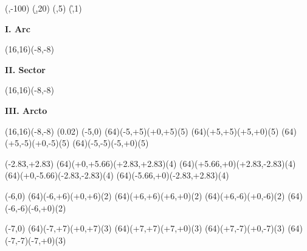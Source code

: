 

\Defnum(\a,-100)
\Defnum(\b,20)
\Defnum(\n,5)
\Defdim(\r,1)



\begin{center}
{\Huge\bf{I. Arc}}
\bigskip

\begin{lapdf}(16,16)(-8,-8)
\end{lapdf}
\end{center}

\newpage

\begin{center}
{\Huge\bf{II. Sector}}
\bigskip

\begin{lapdf}(16,16)(-8,-8)
 \Resetcol
\end{lapdf}
\end{center}

\newpage

\begin{center}
{\Huge\bf{III. Arcto}}
\bigskip

\begin{lapdf}(16,16)(-8,-8)
 \Setwidth(0.02)
 \Moveto(-5,0)
 \Red
 \Arcto(64)(-5,+5)(+0,+5)(5)
 \Green
 \Arcto(64)(+5,+5)(+5,+0)(5)
 \Blue
 \Arcto(64)(+5,-5)(+0,-5)(5)
 \Cyan
 \Arcto(64)(-5,-5)(-5,+0)(5)

 \Moveto(-2.83,+2.83)
 \Red
 \Arcto(64)(+0,+5.66)(+2.83,+2.83)(4)
 \Green
 \Arcto(64)(+5.66,+0)(+2.83,-2.83)(4)
 \Blue
 \Arcto(64)(+0,-5.66)(-2.83,-2.83)(4)
 \Cyan
 \Arcto(64)(-5.66,+0)(-2.83,+2.83)(4)

 \Moveto(-6,0)
 \Red
 \Arcto(64)(-6,+6)(+0,+6)(2)
 \Green
 \Arcto(64)(+6,+6)(+6,+0)(2)
 \Blue
 \Arcto(64)(+6,-6)(+0,-6)(2)
 \Cyan
 \Arcto(64)(-6,-6)(-6,+0)(2)

 \Moveto(-7,0)
 \Red
 \Arcto(64)(-7,+7)(+0,+7)(3)
 \Green
 \Arcto(64)(+7,+7)(+7,+0)(3)
 \Blue
 \Arcto(64)(+7,-7)(+0,-7)(3)
 \Cyan
 \Arcto(64)(-7,-7)(-7,+0)(3)
\end{lapdf}
\end{center}

\newpage

